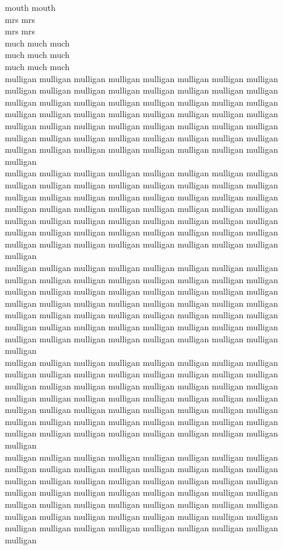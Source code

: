 mouth mouth\\
mrs mrs\\
mrs mrs\\
much much much\\
much much much\\
much much much\\
mulligan mulligan mulligan mulligan mulligan mulligan mulligan mulligan mulligan mulligan mulligan mulligan mulligan mulligan mulligan mulligan mulligan mulligan mulligan mulligan mulligan mulligan mulligan mulligan mulligan mulligan mulligan mulligan mulligan mulligan mulligan mulligan mulligan mulligan mulligan mulligan mulligan mulligan mulligan mulligan mulligan mulligan mulligan mulligan mulligan mulligan mulligan mulligan mulligan mulligan mulligan mulligan mulligan mulligan mulligan mulligan mulligan\\
mulligan mulligan mulligan mulligan mulligan mulligan mulligan mulligan mulligan mulligan mulligan mulligan mulligan mulligan mulligan mulligan mulligan mulligan mulligan mulligan mulligan mulligan mulligan mulligan mulligan mulligan mulligan mulligan mulligan mulligan mulligan mulligan mulligan mulligan mulligan mulligan mulligan mulligan mulligan mulligan mulligan mulligan mulligan mulligan mulligan mulligan mulligan mulligan mulligan mulligan mulligan mulligan mulligan mulligan mulligan mulligan mulligan\\
mulligan mulligan mulligan mulligan mulligan mulligan mulligan mulligan mulligan mulligan mulligan mulligan mulligan mulligan mulligan mulligan mulligan mulligan mulligan mulligan mulligan mulligan mulligan mulligan mulligan mulligan mulligan mulligan mulligan mulligan mulligan mulligan mulligan mulligan mulligan mulligan mulligan mulligan mulligan mulligan mulligan mulligan mulligan mulligan mulligan mulligan mulligan mulligan mulligan mulligan mulligan mulligan mulligan mulligan mulligan mulligan mulligan\\
mulligan mulligan mulligan mulligan mulligan mulligan mulligan mulligan mulligan mulligan mulligan mulligan mulligan mulligan mulligan mulligan mulligan mulligan mulligan mulligan mulligan mulligan mulligan mulligan mulligan mulligan mulligan mulligan mulligan mulligan mulligan mulligan mulligan mulligan mulligan mulligan mulligan mulligan mulligan mulligan mulligan mulligan mulligan mulligan mulligan mulligan mulligan mulligan mulligan mulligan mulligan mulligan mulligan mulligan mulligan mulligan mulligan\\
mulligan mulligan mulligan mulligan mulligan mulligan mulligan mulligan mulligan mulligan mulligan mulligan mulligan mulligan mulligan mulligan mulligan mulligan mulligan mulligan mulligan mulligan mulligan mulligan mulligan mulligan mulligan mulligan mulligan mulligan mulligan mulligan mulligan mulligan mulligan mulligan mulligan mulligan mulligan mulligan mulligan mulligan mulligan mulligan mulligan mulligan mulligan mulligan mulligan mulligan mulligan mulligan mulligan mulligan mulligan mulligan mulligan\\
